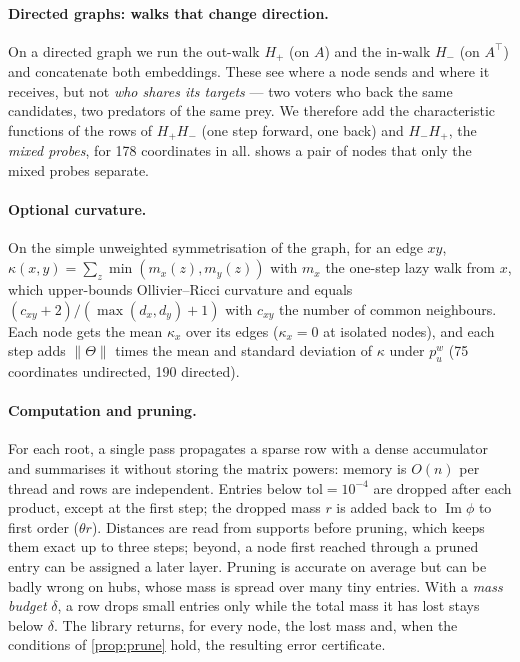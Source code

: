 \documentclass[10pt]{article}
\theoremstyle{definition}
\newcommand{\tol}{\mathrm{tol}}
\newcommand{\nTh}{\lVert\Theta\rVert}
\begin{document}
\paragraph{Directed graphs: walks that change direction.}
On a directed graph we run the out-walk $H_+$ (on $A$) and the in-walk $H_-$ (on $A^\top$) and concatenate both embeddings.
These see where a node sends and where it receives, but not \emph{who shares its targets} --- two voters who back the same candidates, two predators of the same prey.
We therefore add the characteristic functions of the rows of $H_+H_-$ (one step forward, one back) and $H_-H_+$, the \emph{mixed probes}, for 178 coordinates in all.
 shows a pair of nodes that only the mixed probes separate.

\paragraph{Optional curvature.}
On the simple unweighted symmetrisation of the graph, for an edge $xy$, $\kappa(x,y) = \sum_z \min(m_x(z), m_y(z))$ with $m_x$ the one-step lazy walk from $x$, which upper-bounds Ollivier--Ricci curvature \citep{ollivier2009,jost2014} and equals $(c_{xy}+2)/(\max(d_x,d_y)+1)$ with $c_{xy}$ the number of common neighbours.
Each node gets the mean $\kappa_x$ over its edges ($\kappa_x = 0$ at isolated nodes), and each step adds $\nTh$ times the mean and standard deviation of $\kappa$ under $p^w_u$ (75 coordinates undirected, 190 directed).

\paragraph{Computation and pruning.}
For each root, a single pass propagates a sparse row with a dense accumulator and summarises it without storing the matrix powers: memory is $O(n)$ per thread and rows are independent.
Entries below $\tol = 10^{-4}$ are dropped after each product, except at the first step; the dropped mass $r$ is added back to $\operatorname{Im}\phi$ to first order ($\theta r$). Distances are read from supports before pruning, which keeps them exact up to three steps; beyond, a node first reached through a pruned entry can be assigned a later layer.
Pruning is accurate on average but can be badly wrong on hubs, whose mass is spread over many tiny entries.
With a \emph{mass budget} $\delta$, a row drops small entries only while the total mass it has lost stays below $\delta$.
The library returns, for every node, the lost mass and, when the conditions of \cref{prop:prune} hold, the resulting error certificate.
\end{document}
